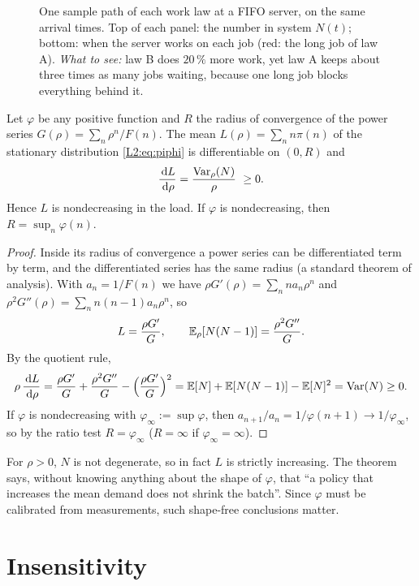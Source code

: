 \begin{figure}[t]
\caption{One sample path of each work law at a FIFO server, on the same arrival times.
Top of each panel: the number in system $N(t)$; bottom: when the server works on each
job (red: the long job of law A). \emph{What to see:} law B does $20\,\%$ more work,
yet law A keeps about three times as many jobs waiting, because one long job blocks
everything behind it.}
\label{fig:more-work}
\end{figure}

\begin{theorem}\label{thm:L-mono}
Let $\varphi$ be any positive function and $R$ the radius of convergence of the power
series $G(\rho)=\sum_n\rho^n/F(n)$. The mean $L(\rho)=\sum_n n\pi(n)$ of the stationary
distribution \eqref{L2:eq:piphi} is differentiable on $(0,R)$ and
\[
  \frac{\,\mathrm{d} L}{\,\mathrm{d}\rho}=\frac{\operatorname{Var}_\rho(N)}{\rho}\ \ge 0 .
\]
Hence $L$ is nondecreasing in the load. If $\varphi$ is nondecreasing, then
$R=\sup_n\varphi(n)$.
\end{theorem}
\begin{proof}
Inside its radius of convergence a power series can be differentiated term by term,
and the differentiated series has the same radius (a standard theorem of analysis).
With $a_n=1/F(n)$ we have $\rho G'(\rho)=\sum_n n a_n\rho^n$ and
$\rho^2G''(\rho)=\sum_n n(n-1)a_n\rho^n$, so
\[
  L=\frac{\rho G'}{G},\qquad \mathbb{E}_\rho[N(N-1)]=\frac{\rho^2G''}{G}.
\]
By the quotient rule,
\[
  \rho\,\frac{\,\mathrm{d} L}{\,\mathrm{d}\rho}
  =\frac{\rho G'}{G}+\frac{\rho^2G''}{G}-\Bigl(\frac{\rho G'}{G}\Bigr)^2
  =\mathbb{E}[N]+\mathbb{E}[N(N-1)]-\mathbb{E}[N]^2=\operatorname{Var}(N)\ge0 .
\]
If $\varphi$ is nondecreasing with $\varphi_\infty:=\sup\varphi$, then
$a_{n+1}/a_n=1/\varphi(n+1)\to1/\varphi_\infty$, so by the ratio test
$R=\varphi_\infty$ ($R=\infty$ if $\varphi_\infty=\infty$).
\end{proof}

For $\rho>0$, $N$ is not degenerate, so in fact $L$ is strictly increasing. The theorem
says, without knowing anything about the shape of $\varphi$, that ``a policy that
increases the mean demand does not shrink the batch''. Since $\varphi$ must be
calibrated from measurements, such shape-free conclusions matter.

\section{Insensitivity}

